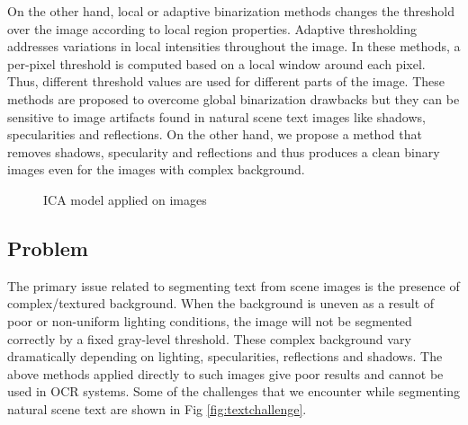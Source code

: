 On the other hand, local or adaptive binarization \cite{A8} methods changes the threshold over the image according to local region properties.
Adaptive thresholding addresses variations in local intensities throughout the image.
In these methods, a per-pixel threshold is computed based on a local window around each pixel. 
Thus, different threshold values are used for different parts of the image. 
These methods are proposed to overcome global binarization drawbacks but they can be sensitive
to image artifacts found in natural scene text images like shadows, specularities and reflections.
On the other hand, we propose a method that removes shadows, specularity and reflections and thus produces a clean 
binary images even for the images with complex background.
\begin{figure}[t]
\centering
{}
\caption
{ICA model applied on images}
\label{fig:ICAmodel}
\end{figure}
\subsection{Problem}
The primary issue related to segmenting text from scene images is the presence of complex/textured background. 
When the background is uneven as a result of poor or non-uniform lighting conditions, the image will not be 
segmented correctly by a fixed gray-level threshold. These complex background vary dramatically depending on
lighting, specularities, reflections and shadows. The above methods applied directly to such images
give poor results and cannot be used in OCR systems. 
Some of the challenges that we encounter while segmenting natural scene text are shown in 
Fig \ref{fig:textchallenge}.

